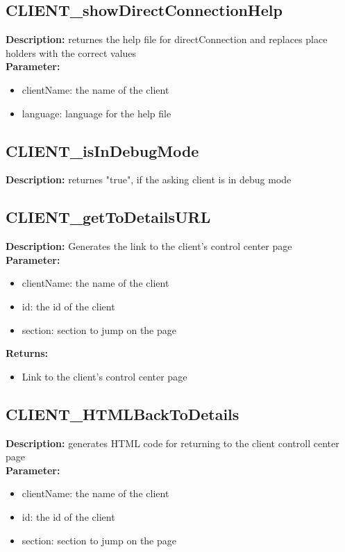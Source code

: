 \subsection{CLIENT\_showDirectConnectionHelp}
\textbf{Description:} returnes the help file for directConnection and replaces place holders with the correct values\\
\textbf{Parameter:}
\begin{itemize}
\item clientName: the name of the client
\item language: language for the help file
\end{itemize}

\subsection{CLIENT\_isInDebugMode}
\textbf{Description:} returnes "true", if the asking client is in debug mode\\

\subsection{CLIENT\_getToDetailsURL}
\textbf{Description:} Generates the link to the client's control center page\\
\textbf{Parameter:}
\begin{itemize}
\item clientName: the name of the client
\item id: the id of the client
\item section: section to jump on the page
\end{itemize}
\textbf{Returns:}
\begin{itemize}
\item Link to the client's control center page
\end{itemize}

\subsection{CLIENT\_HTMLBackToDetails}
\textbf{Description:} generates HTML code for returning to the client controll center page\\
\textbf{Parameter:}
\begin{itemize}
\item clientName: the name of the client
\item id: the id of the client
\item section: section to jump on the page
\end{itemize}

